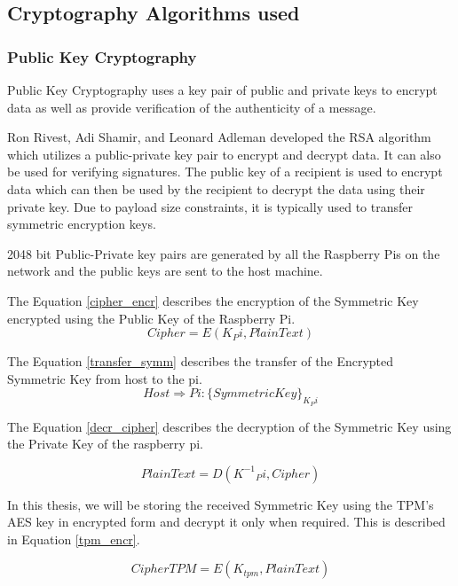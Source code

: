 \documentclass[11pt,openright]{report}
\begin{document}
\subsection{Cryptography Algorithms used}
\subsubsection{Public Key Cryptography}

Public Key Cryptography uses a key pair of public and private keys to encrypt data as well as provide verification of the authenticity of a message.

Ron Rivest, Adi Shamir, and Leonard Adleman developed the RSA algorithm which utilizes a public-private key pair to encrypt and decrypt data. It can also be used for verifying signatures. The public key of a recipient is used to encrypt data which can then be used by the recipient to decrypt the data using their private key. Due to payload size constraints, it is typically used to transfer symmetric encryption keys.

2048 bit Public-Private key pairs are generated by all the Raspberry Pis on the network and the public keys are sent to the host machine.

The Equation \ref{cipher_encr} describes the encryption of the Symmetric Key encrypted using the Public Key of the Raspberry Pi.
\begin{equation} \label{cipher_encr}
    Cipher = E(K_Pi, PlainText)
\end{equation}

The Equation \ref{transfer_symm} describes the transfer of the Encrypted Symmetric Key from host to the pi.
\begin{equation} \label{transfer_symm}
   Host \Rightarrow Pi : \{SymmetricKey\}_{K_Pi}
\end{equation}

The Equation \ref{decr_cipher} describes the decryption of the Symmetric Key using the Private Key of the raspberry pi. 

\begin{equation}\label{decr_cipher}
    PlainText = D({K^{-1}}_Pi, Cipher)
\end{equation}

In this thesis, we will be storing the received Symmetric Key using the TPM's AES key in encrypted form and decrypt it only when required. This is described in Equation \ref{tpm_encr}.

\begin{equation}\label{tpm_encr}
    CipherTPM = E(K_{tpm}, PlainText)
\end{equation}
\end{document}

